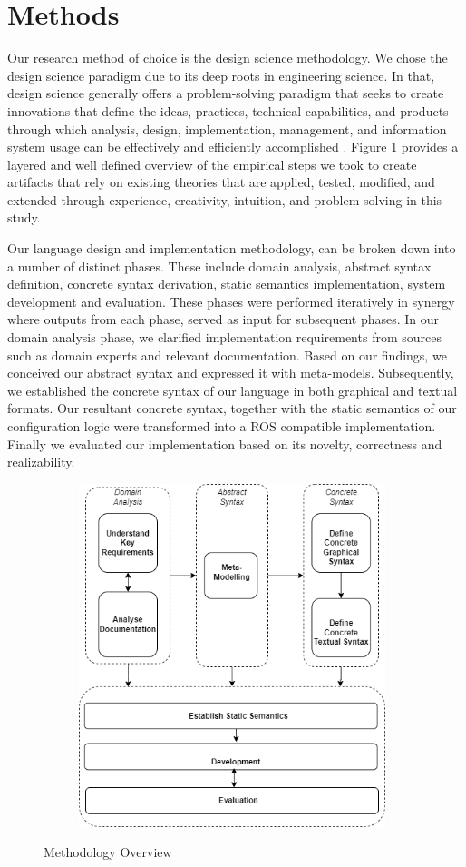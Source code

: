 \documentclass[conference]{IEEEtran}
\begin{document}
\section{Methods}
Our research method of choice is the design science methodology. We chose the design science paradigm due to its deep roots in engineering science. In that, design science generally offers a problem-solving paradigm that seeks to create innovations that define the ideas, practices, technical capabilities, and products through which analysis, design, implementation, management, and information system usage can be effectively and efficiently accomplished  \cite{des-res}. Figure \ref{methover} provides a layered and well defined overview of the empirical steps we took to create artifacts that rely on existing theories that are applied, tested, modified, and extended through experience, creativity, intuition, and problem solving in this study.

Our language design and implementation methodology, can be broken down into a number of distinct phases. These include domain analysis, abstract syntax definition, concrete syntax derivation, static semantics implementation, system development and evaluation. These phases were performed iteratively in synergy where outputs from each phase, served as input for subsequent phases. In our domain analysis phase, we clarified implementation requirements from sources such as domain experts and relevant documentation. Based on our findings, we conceived our abstract syntax and expressed it with meta-models. Subsequently, we established the concrete syntax of our language in both graphical and textual formats. Our resultant concrete syntax, together with the static semantics of our configuration logic were transformed into a ROS compatible implementation. Finally we evaluated our implementation based on its novelty, correctness and realizability.

\begin{figure}[H]
\caption{Methodology Overview}
\centering
\includegraphics[keepaspectratio,height=10cm, width=11cm]{diagrams/methods.png}
\label{methover}
\end{figure}
\end{document}
